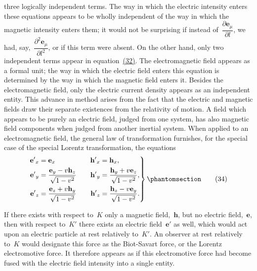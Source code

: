 \documentclass[12pt]{book}[2005/09/16]
\newcommand{\Change}[2]{#2}
\newcommand{\Add}[1]{\Change{}{#1}}
\newcommand{\PageSep}[1]{\ignorespaces}
\newcommand{\Tag}[1]{%
  \phantomsection
  \label{eqn:#1}
  \tag*{#1}
}
\newcommand{\Eqref}[1]{\hyperref[eqn:#1]{#1}}
\newcommand{\dd}{\partial}
\newcommand{\Vector}[1]{\mathbf{#1}}
\newcommand{\e}{\Vector{e}}
\newcommand{\h}{\Vector{h}}
\begin{document}
three logically independent terms. The way in which
the electric intensity enters these equations appears to
be wholly independent of the way in which the magnetic
intensity enters them; it would not be surprising if instead
of~$\dfrac{\dd \e_{\mu}}{\dd l}$, we had, say,~$\dfrac{\dd^{2} \e_{\mu}}{\dd l^{2}}$, or if this term were absent. On
the other hand, only two independent terms appear in
equation~\Eqref{(32)}. The electromagnetic field appears as a
formal unit; the way in which the electric field enters
this equation is determined by the way in which the
magnetic field enters it. Besides the electromagnetic
field, only the electric current density appears as an
independent entity. This advance in method arises from
the fact that the electric and magnetic fields draw their
separate existences from the relativity of motion. A
field which appears to be purely an electric field, judged
from one system, has also magnetic field components
when judged from another inertial system. When applied
to an electromagnetic field, the general law of transformation
furnishes, for the special case of the special Lorentz
transformation, the equations
\PageSep{46}
\[
\left.
\begin{alignedat}{2}
{\e'}_{x} &= \e_{x}\qquad & {\h'}_{x} &= \h_{x}\Add{,} \\
{\e'}_{y} &= \frac{\e_{y} - v\h_{z}}{\sqrt{1 - v^{2}}}\qquad &
{\h'}_{y} &= \frac{\h_{y} + v\e_{z}}{\sqrt{1 - v^{2}}}\Add{,} \\
{\e'}_{z} &= \frac{\e_{z} + v\h_{y}}{\sqrt{1 - v^{2}}}\qquad &
{\h'}_{z} &= \frac{\h_{z} - v\e_{y}}{\sqrt{1 - v^{2}}}\Add{.}
\end{alignedat}
\right\}
\Tag{(34)}
\]

If there exists with respect to~$K$ only a magnetic field,~$\h$,
but no electric field,~$\e$, then with respect to~$K'$ there
exists an electric field~$\e'$ as well, which would act upon
an electric particle at rest relatively to~$K'$. An observer
at rest relatively to~$K$ would designate this force as the
Biot-Savart force, or the Lorentz electromotive force. It
%
%
therefore appears as if this electromotive force had become
fused with the electric field intensity into a single entity.
\end{document}
